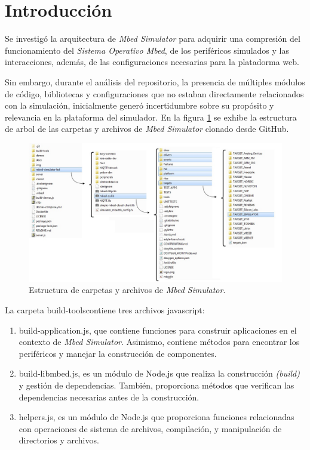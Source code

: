 \section{Introducción}
 
Se investigó la arquitectura de \textit{Mbed Simulator} para adquirir una compresión del funcionamiento del \textit{Sistema Operativo Mbed}, de los periféricos simulados y las interacciones, además, de las configuraciones necesarias para la platadorma web.

Sin embargo, durante el análisis del repositorio, la presencia de múltiples módulos de código, bibliotecas y configuraciones que no estaban directamente relacionados con la simulación, inicialmente generó incertidumbre sobre su propósito y relevancia en la plataforma del simulador. En la figura \ref{fig:estructuraMbed} se exhibe la estructura de arbol de las carpetas y archivos de  \textit{Mbed Simulator} clonado desde GitHub.

\begin{figure}[ht]
	\centering
	\includegraphics[scale=.35]{./Figures/estructuraMbed.jpg}
	\caption{Estructura de carpetas y archivos de \textit{Mbed Simulator}.}
	\label{fig:estructuraMbed}
\end{figure}
 
La carpeta \textquotedbl build-tools\textquotedbl contiene tres archivos javascript: 

\begin{enumerate}
	\item build-application.js, que contiene funciones para construir aplicaciones en el contexto de \textit{Mbed Simulator}. Asimismo, contiene métodos para encontrar los periféricos y manejar la construcción de componentes.
	
	\item build-libmbed.js, es un módulo de Node.js que realiza la construcción \textit{(build)} y gestión de dependencias. También, proporciona métodos que verifican las dependencias necesarias antes de la construcción.

	\item helpers.js,  es un módulo de Node.js que proporciona funciones relacionadas con operaciones de sistema de archivos, compilación, y manipulación de directorios y archivos.
\end{enumerate}
 

